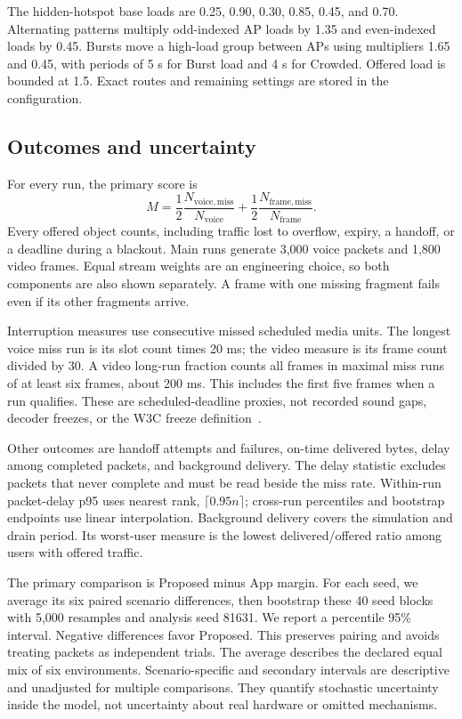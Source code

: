 \documentclass[11pt,a4paper]{article}
\begin{document}
The hidden-hotspot base loads are 0.25, 0.90, 0.30, 0.85, 0.45, and 0.70. Alternating patterns multiply odd-indexed AP loads by 1.35 and even-indexed loads by 0.45. Bursts move a high-load group between APs using multipliers 1.65 and 0.45, with periods of 5 s for Burst load and 4 s for Crowded. Offered load is bounded at 1.5. Exact routes and remaining settings are stored in the configuration.

\subsection{Outcomes and uncertainty}
For every run, the primary score is
\begin{equation}
 M=\frac12\frac{N_{\mathrm{voice,miss}}}{N_{\mathrm{voice}}}+\frac12\frac{N_{\mathrm{frame,miss}}}{N_{\mathrm{frame}}}.
\end{equation}
Every offered object counts, including traffic lost to overflow, expiry, a handoff, or a deadline during a blackout. Main runs generate 3,000 voice packets and 1,800 video frames. Equal stream weights are an engineering choice, so both components are also shown separately. A frame with one missing fragment fails even if its other fragments arrive.

Interruption measures use consecutive missed scheduled media units. The longest voice miss run is its slot count times 20 ms; the video measure is its frame count divided by 30. A video long-run fraction counts all frames in maximal miss runs of at least six frames, about 200 ms. This includes the first five frames when a run qualifies. These are scheduled-deadline proxies, not recorded sound gaps, decoder freezes, or the W3C freeze definition~\cite{M12}.

Other outcomes are handoff attempts and failures, on-time delivered bytes, delay among completed packets, and background delivery. The delay statistic excludes packets that never complete and must be read beside the miss rate. Within-run packet-delay p95 uses nearest rank, $\lceil0.95n\rceil$; cross-run percentiles and bootstrap endpoints use linear interpolation. Background delivery covers the simulation and drain period. Its worst-user measure is the lowest delivered/offered ratio among users with offered traffic.

The primary comparison is Proposed minus App margin. For each seed, we average its six paired scenario differences, then bootstrap these 40 seed blocks with 5,000 resamples and analysis seed 81631. We report a percentile 95\% interval. Negative differences favor Proposed. This preserves pairing and avoids treating packets as independent trials. The average describes the declared equal mix of six environments. Scenario-specific and secondary intervals are descriptive and unadjusted for multiple comparisons. They quantify stochastic uncertainty inside the model, not uncertainty about real hardware or omitted mechanisms.
\end{document}

